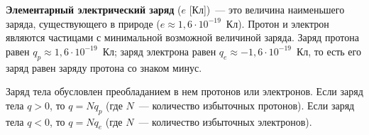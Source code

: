 \documentclass[main.tex]{subfiles}
\begin{document}
\textbf{Элементарный электрический заряд} ($e$ [Кл])~--- это величина наименьшего заряда, существующего в природе ($e\approx1{,}6\cdot10^{-19}$~Кл). Протон и электрон являются частицами с минимальной возможной величиной заряда. Заряд протона равен $q_p\approx1{,}6\cdot10^{-19}$~Кл; заряд электрона равен $q_e\approx-1{,}6\cdot10^{-19}$~Кл, то есть его заряд равен заряду протона со знаком минус. 

Заряд тела обусловлен преобладанием в нем протонов или электронов. Если заряд тела $q>0$, то $q=Nq_p$ (где $N$~--- количество избыточных протонов). Если заряд тела $q<0$, то $q=Nq_e$ (где $N$~--- количество избыточных электронов).























 
\end{document}
